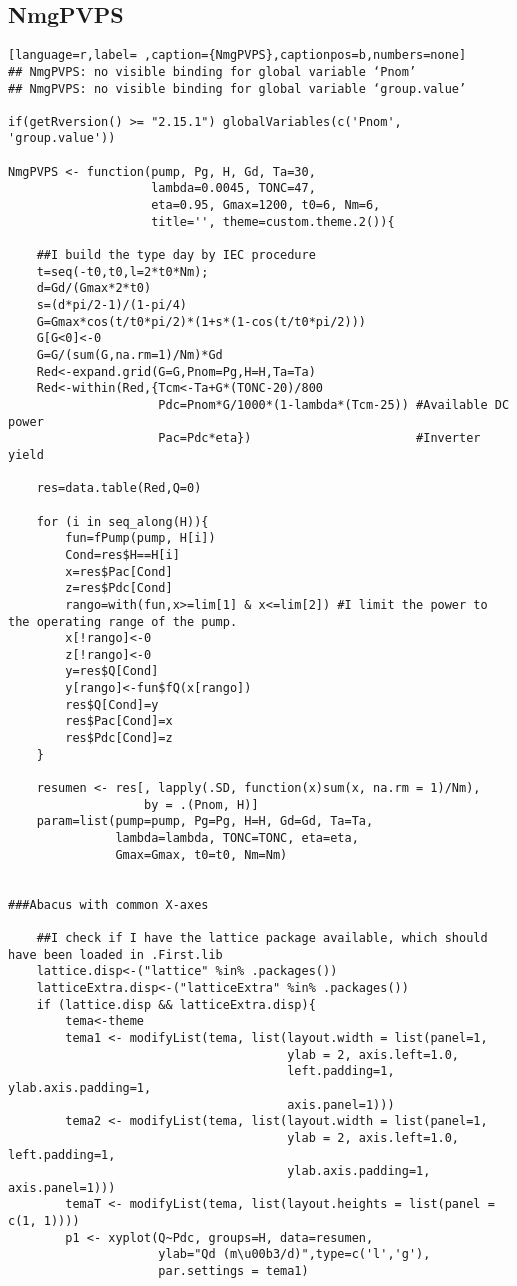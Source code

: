 \subsection{NmgPVPS}
\label{sec:orgb2cb164}
\label{subsec:nmgpvps}
\begin{lstlisting}[language=r,label= ,caption={NmgPVPS},captionpos=b,numbers=none]
## NmgPVPS: no visible binding for global variable ‘Pnom’
## NmgPVPS: no visible binding for global variable ‘group.value’

if(getRversion() >= "2.15.1") globalVariables(c('Pnom', 'group.value'))

NmgPVPS <- function(pump, Pg, H, Gd, Ta=30,
                    lambda=0.0045, TONC=47,
                    eta=0.95, Gmax=1200, t0=6, Nm=6,
                    title='', theme=custom.theme.2()){

    ##I build the type day by IEC procedure
    t=seq(-t0,t0,l=2*t0*Nm);
    d=Gd/(Gmax*2*t0)
    s=(d*pi/2-1)/(1-pi/4)
    G=Gmax*cos(t/t0*pi/2)*(1+s*(1-cos(t/t0*pi/2)))
    G[G<0]<-0
    G=G/(sum(G,na.rm=1)/Nm)*Gd
    Red<-expand.grid(G=G,Pnom=Pg,H=H,Ta=Ta)
    Red<-within(Red,{Tcm<-Ta+G*(TONC-20)/800
                     Pdc=Pnom*G/1000*(1-lambda*(Tcm-25)) #Available DC power
                     Pac=Pdc*eta})                       #Inverter yield

    res=data.table(Red,Q=0)

    for (i in seq_along(H)){
        fun=fPump(pump, H[i])
        Cond=res$H==H[i]
        x=res$Pac[Cond]
        z=res$Pdc[Cond]
        rango=with(fun,x>=lim[1] & x<=lim[2]) #I limit the power to the operating range of the pump.
        x[!rango]<-0
        z[!rango]<-0
        y=res$Q[Cond]
        y[rango]<-fun$fQ(x[rango])
        res$Q[Cond]=y
        res$Pac[Cond]=x
        res$Pdc[Cond]=z
    }

    resumen <- res[, lapply(.SD, function(x)sum(x, na.rm = 1)/Nm),
                   by = .(Pnom, H)]
    param=list(pump=pump, Pg=Pg, H=H, Gd=Gd, Ta=Ta,
               lambda=lambda, TONC=TONC, eta=eta,
               Gmax=Gmax, t0=t0, Nm=Nm)


###Abacus with common X-axes

    ##I check if I have the lattice package available, which should have been loaded in .First.lib
    lattice.disp<-("lattice" %in% .packages())
    latticeExtra.disp<-("latticeExtra" %in% .packages())
    if (lattice.disp && latticeExtra.disp){
        tema<-theme
        tema1 <- modifyList(tema, list(layout.width = list(panel=1,
                                       ylab = 2, axis.left=1.0,
                                       left.padding=1, ylab.axis.padding=1,
                                       axis.panel=1)))
        tema2 <- modifyList(tema, list(layout.width = list(panel=1,
                                       ylab = 2, axis.left=1.0, left.padding=1,
                                       ylab.axis.padding=1, axis.panel=1)))
        temaT <- modifyList(tema, list(layout.heights = list(panel = c(1, 1))))
        p1 <- xyplot(Q~Pdc, groups=H, data=resumen,
                     ylab="Qd (m\u00b3/d)",type=c('l','g'),
                     par.settings = tema1)


\end{lstlisting}

